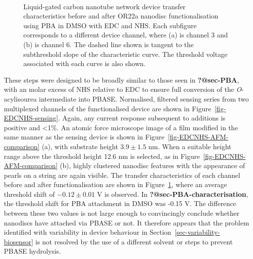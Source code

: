 \documentclass[
  a4paper,
]{scrbook}
\begin{document}
\begin{figure}
\begin{minipage}[t]{0.45\linewidth}
{{}

}

\end{minipage}%
%
\begin{minipage}[t]{0.01\linewidth}

{\centering 

~

}

\end{minipage}%

\caption{\label{fig-EDCNHS-TX}Liquid-gated carbon nanotube network
device transfer characteristics before and after OR22a nanodisc
functionalisation using PBA in DMSO with EDC and NHS. Each subfigure
corresponds to a different device channel, where (a) is channel 3 and
(b) is channel 6. The dashed line shown is tangent to the subthreshold
slope of the characteristic curve. The threshold voltage associated with
each curve is also shown.}

\end{figure}

These steps were designed to be broadly similar to those seen in
\textbf{?@sec-PBA}, with an molar excess of NHS relative to EDC to
ensure full conversion of the \emph{O}-acylisourea intermediate into
PBASE. Normalised, filtered sensing series from two multiplexed channels
of the functionalised device are shown in
Figure~\ref{fig-EDCNHS-sensing}. Again, any current response subsequent
to additions is positive and \textless1\%. An atomic force microscope
image of a film modified in the same manner as the sensing device is
shown in Figure~\ref{fig-EDCNHS-AFM-comparison} (a), with substrate
height \(3.9\pm1.5\) nm. When a suitable height range above the
threshold height 12.6 nm is selected, as in
Figure~\ref{fig-EDCNHS-AFM-comparison} (b), highly clustered nanodisc
features with the appearance of pearls on a string are again visible.
The transfer characteristics of each channel before and after
functionalisation are shown in Figure~\ref{fig-EDCNHS-TX}, where an
average threshold shift of \(-0.12\pm0.01\) V is observed. In
\textbf{?@sec-PBA-characterisation}, the threshold shift for PBA
attachment in DMSO was -0.15 V. The difference between these two values
is not large enough to convincingly conclude whether nanodiscs have
attached via PBASE or not. It therefore appears that the problem
identified with variability in device behaviour in
Section~\ref{sec-variability-biosensor} is not resolved by the use of a
different solvent or steps to prevent PBASE hydrolysis.
\end{document}

